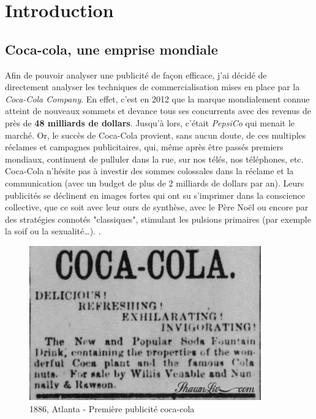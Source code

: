\chapter{Introduction}

\label{Introduction}

\section{Coca-cola, une emprise mondiale}

Afin de pouvoir analyser une publicité de façon efficace, j'ai décidé de directement analyser les techniques de commercialisation mises en place par la \textit{Coca-Cola Company}.
En effet, c'est en 2012 que la marque mondialement connue atteint de nouveaux sommets et devance tous ses concurrents avec des revenus de près de \textbf{48 milliards de dollars}.  Jusqu'à lors, c'était \textit{PepsiCo} qui menait le marché.
Or, le succès de Coca-Cola provient, sans aucun doute, de ces multiples réclames et campagnes publicitaires, qui, même après être passés premiers mondiaux, continuent de pulluler dans la rue, sur nos télés, nos téléphones, etc.\\
Coca-Cola n'hésite pas à investir des sommes colossales dans la réclame et la communication (avec un budget de plus de 2 milliards de dollars par an). Leurs publicités se déclinent en images fortes qui ont su s'imprimer dans la conscience collective, que ce soit avec leur ours de synthèse, avec le Père Noël ou encore par des stratégies connotés "classiques", stimulant les pulsions primaires (par exemple la soif ou la sexualité…). \parencite{Ref1}. \\


\hfill \break

\begin{figure}[th]
\centering
\includegraphics[width=100mm]{medias/1ere_pub}
\decoRule
\caption{1886, Atlanta - Première publicité coca-cola}
\end{figure}
\newpage

